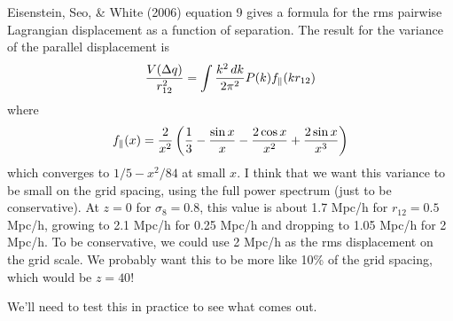 \documentclass[11pt,preprint]{aastex}
\newcommand{\beq}{\begin{equation}}
\newcommand{\eeq}{\end{equation}}
\begin{document}
Eisenstein, Seo, \& White (2006) equation 9 gives a formula for the rms 
pairwise Lagrangian displacement as a function of separation.  The result
for the variance of the parallel displacement is 
\beq
{V(\Delta q)\over r_{12}^2} = \int {k^2\,dk\over 2\pi^2} P(k) f_\parallel(kr_{12})
\eeq
where 
\beq
f_\parallel(x) = {2\over x^2} \left({1\over3} - {\sin x\over x} - {2\cos x\over x^2}
+ {2\sin x\over x^3} \right)
\eeq 
which converges to $1/5-x^2/84$ at small $x$.  I think that we want this
variance to be small on the grid spacing, using the full power spectrum (just to be conservative).  At $z=0$ for $\sigma_8=0.8$, this value is about 1.7 Mpc/h
for $r_{12}=0.5$ Mpc/h, growing to 2.1 Mpc/h for 0.25 Mpc/h and dropping
to 1.05 Mpc/h for 2 Mpc/h.  To be conservative, we could use 2 Mpc/h as the
rms displacement on the grid scale.  We probably want this to be more like
10\% of the grid spacing, which would be $z=40$!

We'll need to test this in practice to see what comes out.
\end{document}

